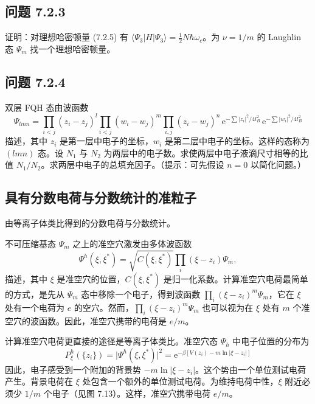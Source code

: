 \subsection*{问题 7.2.3}

证明：对理想哈密顿量 (7.2.5) 有 $\langle\Psi_3|H|\Psi_3\rangle=\frac{1}{2}N\hbar\omega_c$。为 $\nu=1/m$ 的 Laughlin 态 $\Psi_m$ 找一个理想哈密顿量。

\subsection*{问题 7.2.4}

双层 FQH 态由波函数
\begin{equation*}
\Psi_{lmn}=\prod_{i<j}(z_i-z_j)^l\prod_{i<j}(w_i-w_j)^m\prod_{i,j}(z_i-w_j)^n\,\mathrm{e}^{-\sum|z_i|^2/4l_B^2}\,\mathrm{e}^{-\sum|w_i|^2/4l_B^2}
\tag{7.2.6}
\end{equation*}
描述，其中 $z_i$ 是第一层中电子的坐标，$w_i$ 是第二层中电子的坐标。这样的态称为 $(lmn)$ 态。设 $N_1$ 与 $N_2$ 为两层中的电子数。求使两层中电子液滴尺寸相等的比值 $N_1/N_2$。求两层中电子的总填充因子。（提示：可先假设 $n=0$ 以简化问题。）

\subsection{具有分数电荷与分数统计的准粒子}

\begin{keypoints}
\item 由等离子体类比得到的分数电荷与分数统计。
\end{keypoints}

不可压缩基态 $\Psi_m$ 之上的准空穴激发由多体波函数
\begin{equation*}
\Psi^h(\xi,\xi^*)=\sqrt{C(\xi,\xi^*)}\prod_i(\xi-z_i)\Psi_m,
\end{equation*}
描述，其中 $\xi$ 是准空穴的位置，$C(\xi,\xi^*)$ 是归一化系数。计算准空穴电荷最简单的方式，是先从 $\Psi_m$ 态中移除一个电子，得到波函数 $\prod_i(\xi-z_i)^m\Psi_m$，它在 $\xi$ 处有一个电荷为 $e$ 的空穴。然而，$\prod_i(\xi-z_i)^m\Psi_m$ 也可以视为在 $\xi$ 处有 $m$ 个准空穴的波函数。因此，准空穴携带的电荷是 $e/m$。


计算准空穴电荷更直接的途径是等离子体类比。准空穴态 $\Psi_h$ 中电子位置的分布为
\begin{equation*}
P^h_\xi(\{z_i\})=\bigl|\Psi^h(\xi,\xi^*)\bigr|^2=\mathrm{e}^{-\beta[V(z_i)-m\ln|\xi-z_i|]}
\end{equation*}
因此，电子感受到一个附加的背景势 $-m\ln|\xi-z_i|$。这个势由一个单位测试电荷产生。背景电荷在 $\xi$ 处包含一个额外的单位测试电荷。为维持电荷中性，$\xi$ 附近必须少 $1/m$ 个电子（见图 7.13）。这样，准空穴携带电荷 $e/m$。

